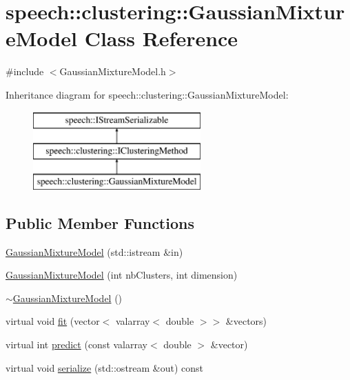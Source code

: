 \hypertarget{classspeech_1_1clustering_1_1GaussianMixtureModel}{\section{speech\+:\+:clustering\+:\+:Gaussian\+Mixture\+Model Class Reference}
\label{classspeech_1_1clustering_1_1GaussianMixtureModel}
}


{\ttfamily \#include $<$Gaussian\+Mixture\+Model.\+h$>$}

Inheritance diagram for speech\+:\+:clustering\+:\+:Gaussian\+Mixture\+Model\+:\begin{figure}[H]
\begin{center}
\leavevmode
\includegraphics[height=3.000000cm]{classspeech_1_1clustering_1_1GaussianMixtureModel}
\end{center}
\end{figure}
\subsection*{Public Member Functions}
\begin{DoxyCompactItemize}
\item 
\hyperlink{classspeech_1_1clustering_1_1GaussianMixtureModel_a42140f884c132d4744d8ddd368073f9f}{Gaussian\+Mixture\+Model} (std\+::istream \&in)
\item 
\hyperlink{classspeech_1_1clustering_1_1GaussianMixtureModel_a0bebe61a309dc205019d319162b8ca03}{Gaussian\+Mixture\+Model} (int nb\+Clusters, int dimension)
\item 
\hyperlink{classspeech_1_1clustering_1_1GaussianMixtureModel_a3a82073609b479ff89e3e2f2a839a092}{$\sim$\+Gaussian\+Mixture\+Model} ()
\item 
virtual void \hyperlink{classspeech_1_1clustering_1_1GaussianMixtureModel_ab14e1843eb9412b32f918c909e19d1c5}{fit} (vector$<$ valarray$<$ double $>$$>$ \&vectors)
\item 
virtual int \hyperlink{classspeech_1_1clustering_1_1GaussianMixtureModel_a5ddd00a86bbc557b4beaf13760dc222f}{predict} (const valarray$<$ double $>$ \&vector)
\item 
virtual void \hyperlink{classspeech_1_1clustering_1_1GaussianMixtureModel_a51a73a7818e57e5b9e2ff6fbd25188f6}{serialize} (std\+::ostream \&out) const 
\end{DoxyCompactItemize}
